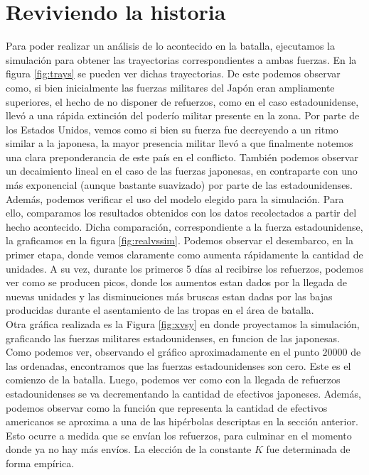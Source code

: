 \documentclass{sig-alternate}
\begin{document}
\section{Reviviendo la historia}
\label{sec:reviving}
Para poder realizar un análisis de lo acontecido en la batalla, ejecutamos la simulación para obtener las 
trayectorias correspondientes a ambas fuerzas. En la figura \ref{fig:trays} se pueden ver dichas trayectorias. 
De este podemos observar como, si bien inicialmente las fuerzas militares del Japón eran ampliamente superiores, el hecho de no disponer de 
refuerzos, como en el caso estadounidense, llevó a una rápida extinción del poderío militar presente en la zona. Por parte de los 
Estados Unidos, vemos como si bien su fuerza fue decreyendo a un ritmo similar a la japonesa, la mayor presencia militar llevó a que finalmente
notemos una clara preponderancia de este país en el conflicto. También podemos observar un decaimiento lineal en el caso de las fuerzas japonesas,
en contraparte con uno más exponencial (aunque bastante suavizado) por parte de las estadounidenses.\\
Además, podemos verificar el uso del modelo elegido para la simulación. Para ello, comparamos los resultados obtenidos con los datos 
recolectados a partir del hecho acontecido. Dicha comparación, correspondiente a la fuerza estadounidense, la graficamos en la figura 
\ref{fig:realvssim}.
Podemos observar el desembarco, en la primer etapa, donde vemos claramente como aumenta rápidamente la cantidad de unidades. 
A su vez, durante los primeros 5 días al recibirse los refuerzos, podemos ver como se producen picos, 
donde los aumentos estan dados por la llegada de nuevas unidades y las disminuciones más bruscas estan dadas 
por las bajas producidas durante el asentamiento de las tropas en el área de batalla.\\
Otra gráfica realizada es la Figura \ref{fig:xvsy} en donde proyectamos la simulación, graficando las fuerzas militares
estadounidenses, en funcion de las japonesas. Como podemos ver, observando el gráfico aproximadamente en el punto $20000$ de las ordenadas,
encontramos que las fuerzas estadounidenses son cero. Este es el comienzo de la batalla. Luego, podemos ver como con la llegada de refuerzos 
estadounidenses se va decrementando la cantidad de efectivos japoneses. Además, podemos observar como la función que representa la cantidad de
efectivos americanos se aproxima a una de las hipérbolas descriptas en la sección anterior. Esto ocurre a medida que se envían los refuerzos,
para culminar en el momento donde ya no hay más envíos. La elección de la constante $K$ fue determinada de forma empírica.
\end{document}
